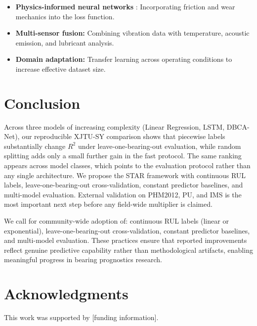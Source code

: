 \documentclass[5p,twocolumn]{elsarticle}
\begin{document}
\begin{itemize}
    \item \textbf{Physics-informed neural networks} \cite{li2022physics}: Incorporating friction and wear mechanics into the loss function.
    \item \textbf{Multi-sensor fusion:} Combining vibration data with temperature, acoustic emission, and lubricant analysis.
    \item \textbf{Domain adaptation:} Transfer learning across operating conditions to increase effective dataset size.
\end{itemize}


\section{Conclusion}
\label{sec:conclusion}

Across three models of increasing complexity (Linear Regression, LSTM, DBCA-Net), our reproducible XJTU-SY comparison shows that piecewise labels substantially change $R^2$ under leave-one-bearing-out evaluation, while random splitting adds only a small further gain in the fast protocol. The same ranking appears across model classes, which points to the evaluation protocol rather than any single architecture. We propose the STAR framework with continuous RUL labels, leave-one-bearing-out cross-validation, constant predictor baselines, and multi-model evaluation. External validation on PHM2012, PU, and IMS is the most important next step before any field-wide multiplier is claimed.

We call for community-wide adoption of: continuous RUL labels (linear or exponential), leave-one-bearing-out cross-validation, constant predictor baselines, and multi-model evaluation. These practices ensure that reported improvements reflect genuine predictive capability rather than methodological artifacts, enabling meaningful progress in bearing prognostics research.


\section*{Acknowledgments}

This work was supported by [funding information].
\end{document}
